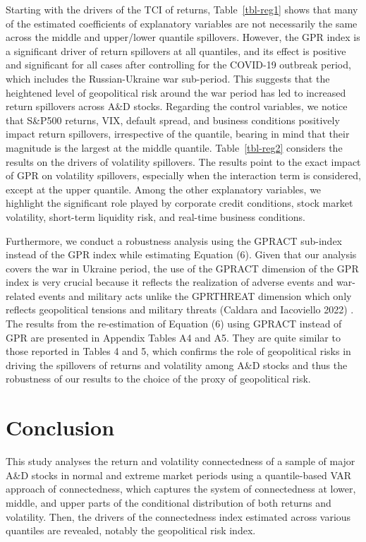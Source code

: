 \documentclass[
  letterpaper,
  DIV=11,
  numbers=noendperiod]{scrartcl}
\begin{document}
Starting with the drivers of the TCI of returns, Table~\ref{tbl-reg1}
shows that many of the estimated coefficients of explanatory variables
are not necessarily the same across the middle and upper/lower quantile
spillovers. However, the GPR index is a significant driver of return
spillovers at all quantiles, and its effect is positive and significant
for all cases after controlling for the COVID-19 outbreak period, which
includes the Russian-Ukraine war sub-period. This suggests that the
heightened level of geopolitical risk around the war period has led to
increased return spillovers across A\&D stocks. Regarding the control
variables, we notice that S\&P500 returns, VIX, default spread, and
business conditions positively impact return spillovers, irrespective of
the quantile, bearing in mind that their magnitude is the largest at the
middle quantile. Table~\ref{tbl-reg2} considers the results on the
drivers of volatility spillovers. The results point to the exact impact
of GPR on volatility spillovers, especially when the interaction term is
considered, except at the upper quantile. Among the other explanatory
variables, we highlight the significant role played by corporate credit
conditions, stock market volatility, short-term liquidity risk, and
real-time business conditions.

Furthermore, we conduct a robustness analysis using the GPRACT sub-index
instead of the GPR index while estimating Equation (6). Given that our
analysis covers the war in Ukraine period, the use of the GPRACT
dimension of the GPR index is very crucial because it reflects the
realization of adverse events and war-related events and military acts
unlike the GPRTHREAT dimension which only reflects geopolitical tensions
and military threats (Caldara and Iacoviello 2022) . The results from
the re-estimation of Equation (6) using GPRACT instead of GPR are
presented in Appendix Tables A4 and A5. They are quite similar to those
reported in Tables 4 and 5, which confirms the role of geopolitical
risks in driving the spillovers of returns and volatility among A\&D
stocks and thus the robustness of our results to the choice of the proxy
of geopolitical risk.

\hypertarget{conclusion}{%
\section{Conclusion}\label{conclusion}}

This study analyses the return and volatility connectedness of a sample
of major A\&D stocks in normal and extreme market periods using a
quantile-based VAR approach of connectedness, which captures the system
of connectedness at lower, middle, and upper parts of the conditional
distribution of both returns and volatility. Then, the drivers of the
connectedness index estimated across various quantiles are revealed,
notably the geopolitical risk index.
\end{document}
